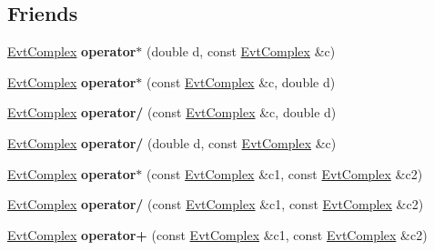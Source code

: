 \subsection*{Friends}
\begin{DoxyCompactItemize}
\item 
\hypertarget{class_evt_complex_abaa765f398dc6c180a46f29c03b53e1e}{}\hyperlink{class_evt_complex}{Evt\+Complex} {\bfseries operator$\ast$} (double d, const \hyperlink{class_evt_complex}{Evt\+Complex} \&c)\label{class_evt_complex_abaa765f398dc6c180a46f29c03b53e1e}

\item 
\hypertarget{class_evt_complex_a3785f6c99cbd1b0754ebfe1bd1a99a21}{}\hyperlink{class_evt_complex}{Evt\+Complex} {\bfseries operator$\ast$} (const \hyperlink{class_evt_complex}{Evt\+Complex} \&c, double d)\label{class_evt_complex_a3785f6c99cbd1b0754ebfe1bd1a99a21}

\item 
\hypertarget{class_evt_complex_a7228b1211cedf051c463bb94839e3251}{}\hyperlink{class_evt_complex}{Evt\+Complex} {\bfseries operator/} (const \hyperlink{class_evt_complex}{Evt\+Complex} \&c, double d)\label{class_evt_complex_a7228b1211cedf051c463bb94839e3251}

\item 
\hypertarget{class_evt_complex_a3bc6a1cdaa3fb4f3fa165deca0724497}{}\hyperlink{class_evt_complex}{Evt\+Complex} {\bfseries operator/} (double d, const \hyperlink{class_evt_complex}{Evt\+Complex} \&c)\label{class_evt_complex_a3bc6a1cdaa3fb4f3fa165deca0724497}

\item 
\hypertarget{class_evt_complex_a65df1ad2ed89d54a606847c133bed070}{}\hyperlink{class_evt_complex}{Evt\+Complex} {\bfseries operator$\ast$} (const \hyperlink{class_evt_complex}{Evt\+Complex} \&c1, const \hyperlink{class_evt_complex}{Evt\+Complex} \&c2)\label{class_evt_complex_a65df1ad2ed89d54a606847c133bed070}

\item 
\hypertarget{class_evt_complex_a4359660cb0b865f13427565a9c593582}{}\hyperlink{class_evt_complex}{Evt\+Complex} {\bfseries operator/} (const \hyperlink{class_evt_complex}{Evt\+Complex} \&c1, const \hyperlink{class_evt_complex}{Evt\+Complex} \&c2)\label{class_evt_complex_a4359660cb0b865f13427565a9c593582}

\item 
\hypertarget{class_evt_complex_af536bcb28ade62157f21e06fd760949b}{}\hyperlink{class_evt_complex}{Evt\+Complex} {\bfseries operator+} (const \hyperlink{class_evt_complex}{Evt\+Complex} \&c1, const \hyperlink{class_evt_complex}{Evt\+Complex} \&c2)\label{class_evt_complex_af536bcb28ade62157f21e06fd760949b}


\end{DoxyCompactItemize}
